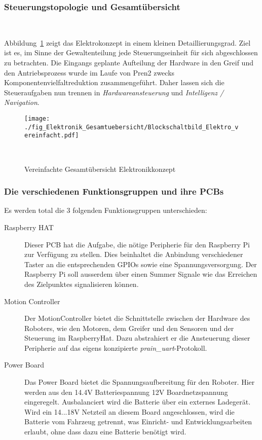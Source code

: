 \documentclass[main.tex]{subfiles} %
\begin{document}

\subsubsection{Steuerungstopologie und Gesamtübersicht}~\label{sec:Gesamtuebersicht_Elektro}

Abbildung~\ref{fig:Gesamtuebersicht_vereinfacht} zeigt das Elektrokonzept in
einem kleinen Detaillierungsgrad. Ziel ist es, im Sinne der Gewaltenteilung
jede Steuerungseinheit für sich abgeschlossen zu betrachten. Die Eingangs
geplante Aufteilung der Hardware in den Greif und den Antriebsprozess wurde im
Laufe von Pren2 zwecks Komponentenvielfaltreduktion zusammengeführt. Daher
lassen sich die Steueraufgaben nun trennen in \textit{Hardwareansteuerung} und
\textit{Intelligenz / Navigation}.

\begin{figure}[H]
    \centering
    \texttt{[image: ./fig\_Elektronik\_Gesamtuebersicht/Blockschaltbild\_Elektro\_vereinfacht.pdf]}
    \caption{Vereinfachte Gesamtübersicht Elektronikkonzept}~\label{fig:Gesamtuebersicht_vereinfacht}
\end{figure}

\subsubsection*{Die verschiedenen Funktionsgruppen und ihre PCBs}
Es werden total die 3 folgenden Funktionsgruppen unterschieden:

\begin{description}
    \item[Raspberry HAT] Dieser PCB hat die Aufgabe, die nötige Peripherie für den
        Raspberry Pi zur Verfügung zu stellen. Dies beinhaltet die Anbindung
        verschiedener Taster an die entsprechenden GPIOs sowie eine
        Spannungsversorgung. Der Raspberry Pi soll ausserdem über einen Summer Signale
        wie das Erreichen des Zielpunktes signalisieren können.
    \item[Motion Controller] Der MotionController bietet die Schnittstelle zwischen der
        Hardware des Roboters, wie den Motoren, dem Greifer und den Sensoren und der
        Steuerung im RaspberryHat. Dazu abstrahiert er die Ansteuerung dieser
        Peripherie auf das eigens konzipierte \textit{prain_uart}-Protokoll.
    \item[Power Board] Das Power Board bietet die Spannungsaufbereitung für den Roboter.
        Hier werden aus den 14.4V Batteriespannung 12V Boardnetzspannung eingeregelt.
        Ausbalanciert wird die Batterie über ein externes Ladegerät. Wird ein 14...18V
        Netzteil an diesem Board angeschlossen, wird die Batterie vom Fahrzeug
        getrennt, was Einricht- und Entwicklungsarbeiten erlaubt, ohne dass dazu eine
        Batterie benötigt wird.
\end{description}
\end{document}
